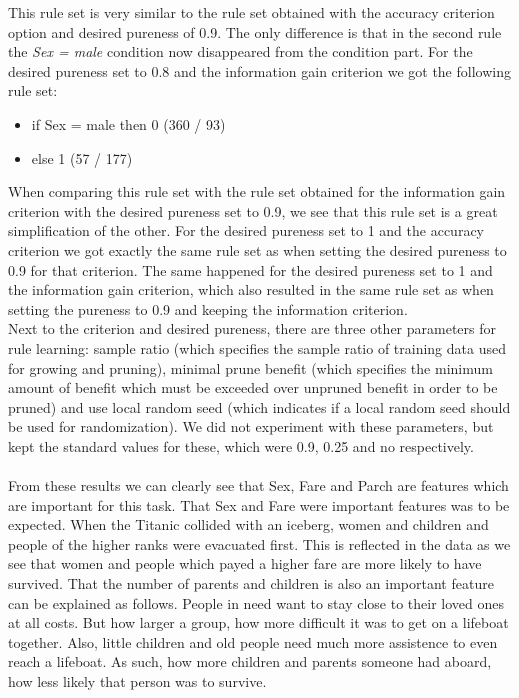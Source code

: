 \documentclass[12pt,a4paper]{article}
\begin{document}
This rule set is very similar to the rule set obtained with the accuracy criterion option and desired pureness of 0.9. The only difference is that in the second rule the \textit{Sex = male} condition now disappeared from the condition part. 
For the desired pureness set to 0.8 and the information gain criterion we got the following rule set:
\begin{itemize}

\item if Sex = male then 0  (360 / 93)
\item else 1  (57 / 177)

\end{itemize}
When comparing this rule set with the rule set obtained for the information gain criterion with the desired pureness set to 0.9, we see that this rule set is a great simplification of the other.
For the desired pureness set to 1 and the accuracy criterion we got exactly the same rule set as when setting the desired pureness to 0.9 for that criterion. The same happened for the desired pureness set to 1 and the information gain criterion, which also resulted in the same rule set as when setting the pureness to 0.9 and keeping the information criterion.\\
Next to the criterion and desired pureness, there are three other parameters for rule learning: sample ratio (which specifies the sample ratio of training data used for growing and pruning), minimal prune benefit (which specifies the minimum amount of benefit which must be exceeded over unpruned benefit in order to be pruned) and use local random seed (which indicates if a local random seed should be used for randomization). We did not experiment with these parameters, but kept the standard values for these, which were 0.9, 0.25 and no respectively.\\
\\
From these results we can clearly see that Sex, Fare and Parch are features which are important for this task. That Sex and Fare were important features was to be expected. When the Titanic collided with an iceberg, women and children and people of the higher ranks were evacuated first. This is reflected in the data as we see that women and people which payed a higher fare are more likely to have survived. That the number of parents and children is also an important feature can be explained as follows. People in need want to stay close to their loved ones at all costs. But how larger a group, how more difficult it was to get on a lifeboat together. Also, little children and old people need much more assistence to even reach a lifeboat. As such, how more children and parents someone had aboard, how less likely that person was to survive.
\end{document}

